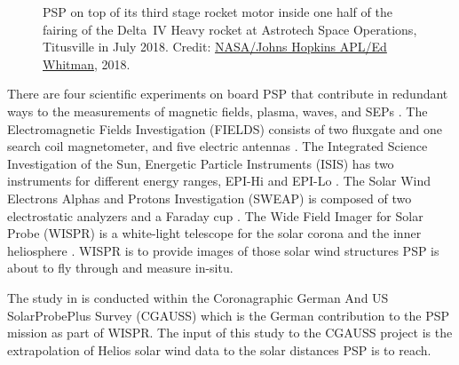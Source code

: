 \begin{figure}[htb]
\begin{floatrow}
{		}{
			\caption[Credit: \href{http://parkersolarprobe.jhuapl.edu/Multimedia/Images.php}{NASA/Johns Hopkins APL/Ed Whitman}, 2018.]
			{PSP on top of its third stage rocket motor inside one half of the fairing of the Delta~IV Heavy rocket at Astrotech Space Operations, Titusville in July 2018. Credit: \href{http://parkersolarprobe.jhuapl.edu/Multimedia/Images.php}{NASA/Johns Hopkins APL/Ed Whitman}, 2018.}
			\label{fig:PSP_fencap2_square}
		}
	\end{floatrow}
\end{figure}

There are four scientific experiments on board PSP that contribute in redundant ways to the measurements of magnetic fields, plasma, waves, and SEPs \citep{Fox2015}.
The Electromagnetic Fields Investigation (FIELDS) consists of two fluxgate and one search coil magnetometer, and five electric antennas \citep{Bale2016}. %
The Integrated Science Investigation of the Sun, Energetic Particle Instruments (IS\sun{}IS) has two instruments for different energy ranges, EPI-Hi and EPI-Lo \citep{McComas2016}. %
The Solar Wind Electrons Alphas and Protons Investigation (SWEAP) is composed of two electrostatic analyzers and a Faraday cup \citep{Kasper2016}. %
The Wide Field Imager for Solar Probe (WISPR) is a white-light telescope for the solar corona and the inner heliosphere \citep{Vourlidas2016}. WISPR is to provide images of those solar wind structures PSP is about to fly through and measure in-situ. %

The study in \citet{Venzmer2018} is conducted within the Coronagraphic German And US SolarProbePlus Survey (CGAUSS) which is the German contribution to the PSP mission as part of WISPR. The input of this study to the CGAUSS project is the extrapolation of Helios solar wind data to the solar distances PSP is to reach.


